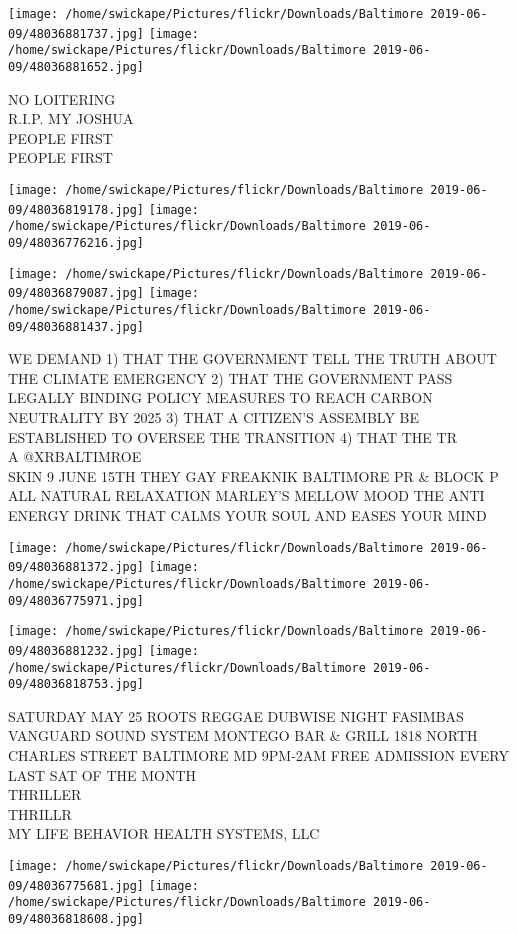 \documentclass[10pt,letterpaper]{article}
\begin{document}
\texttt{[image: /home/swickape/Pictures/flickr/Downloads/Baltimore 2019-06-09/48036881737.jpg]}
\texttt{[image: /home/swickape/Pictures/flickr/Downloads/Baltimore 2019-06-09/48036881652.jpg]}

NO LOITERING\\
R.I.P. MY JOSHUA\\
PEOPLE FIRST\\
PEOPLE FIRST
\pagebreak

\texttt{[image: /home/swickape/Pictures/flickr/Downloads/Baltimore 2019-06-09/48036819178.jpg]}
\texttt{[image: /home/swickape/Pictures/flickr/Downloads/Baltimore 2019-06-09/48036776216.jpg]}

\texttt{[image: /home/swickape/Pictures/flickr/Downloads/Baltimore 2019-06-09/48036879087.jpg]}
\texttt{[image: /home/swickape/Pictures/flickr/Downloads/Baltimore 2019-06-09/48036881437.jpg]}

WE DEMAND 1) THAT THE GOVERNMENT TELL THE TRUTH ABOUT THE CLIMATE EMERGENCY 2) THAT THE GOVERNMENT PASS LEGALLY BINDING POLICY MEASURES TO REACH CARBON NEUTRALITY BY 2025 3) THAT A CITIZEN'S ASSEMBLY BE ESTABLISHED TO OVERSEE THE TRANSITION 4) THAT THE TR\\
A @XRBALTIMROE\\
SKIN 9 JUNE 15TH THEY GAY FREAKNIK BALTIMORE PR \& BLOCK P\\
ALL NATURAL RELAXATION MARLEY'S MELLOW MOOD THE ANTI ENERGY DRINK THAT CALMS YOUR SOUL AND EASES YOUR MIND
\pagebreak

\texttt{[image: /home/swickape/Pictures/flickr/Downloads/Baltimore 2019-06-09/48036881372.jpg]}
\texttt{[image: /home/swickape/Pictures/flickr/Downloads/Baltimore 2019-06-09/48036775971.jpg]}

\texttt{[image: /home/swickape/Pictures/flickr/Downloads/Baltimore 2019-06-09/48036881232.jpg]}
\texttt{[image: /home/swickape/Pictures/flickr/Downloads/Baltimore 2019-06-09/48036818753.jpg]}

SATURDAY MAY 25 ROOTS REGGAE DUBWISE NIGHT FASIMBAS VANGUARD SOUND SYSTEM MONTEGO BAR \& GRILL 1818 NORTH CHARLES STREET BALTIMORE MD 9PM{-}2AM FREE ADMISSION EVERY LAST SAT OF THE MONTH\\
THRILLER\\
THRILLR\\
MY LIFE BEHAVIOR HEALTH SYSTEMS, LLC
\pagebreak

\texttt{[image: /home/swickape/Pictures/flickr/Downloads/Baltimore 2019-06-09/48036775681.jpg]}
\texttt{[image: /home/swickape/Pictures/flickr/Downloads/Baltimore 2019-06-09/48036818608.jpg]}
\end{document}
